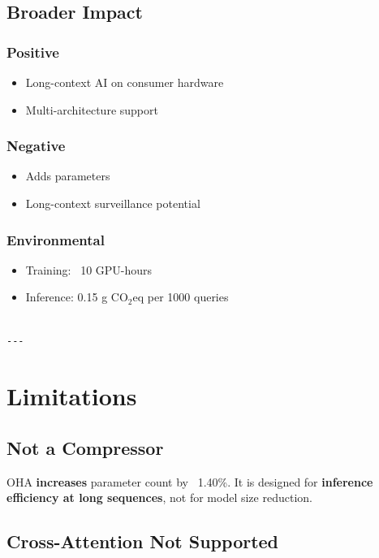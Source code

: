\subsection{Broader Impact}

\subsubsection{Positive}
\begin{itemize}
\item Long-context AI on consumer hardware
\item Multi-architecture support

\end{itemize}
\subsubsection{Negative}
\begin{itemize}
\item Adds parameters
\item Long-context surveillance potential

\end{itemize}
\subsubsection{Environmental}
\begin{itemize}
\item Training: ~10 GPU-hours
\item Inference: 0.15 g CO$_2$eq per 1000 queries
\end{itemize}
\begin{lstlisting}

---
\end{lstlisting}


\section{Limitations}

\subsection{Not a Compressor}

OHA \textbf{increases} parameter count by ~1.40\%. It is designed for 
\textbf{inference efficiency at long sequences}, not for model size reduction.

\subsection{Cross-Attention Not Supported}

